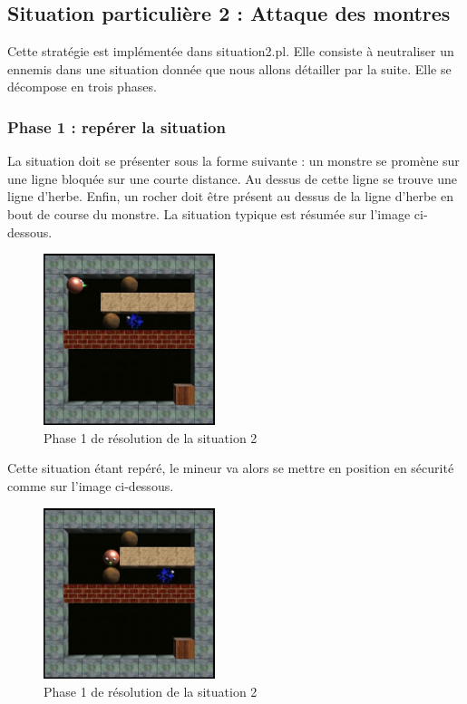 \documentclass[a4paper,11pt]{article}
\begin{document}
	\newpage
	\subsection{Situation particuli\`ere 2 : Attaque des montres}
	
	Cette strat\'egie est impl\'ement\'ee dans situation2.pl. Elle consiste \`a neutraliser un ennemis dans une situation donn\'ee que nous allons d\'etailler par la suite. Elle se d\'ecompose en trois phases.

	\subsubsection{Phase 1 : rep\'erer la situation}
	
La situation doit se pr\'esenter sous la forme suivante : un monstre se prom\`ene sur une ligne bloqu\'ee sur une courte distance. Au dessus de cette ligne se trouve une ligne d'herbe. Enfin, un rocher doit \^etre pr\'esent au dessus de la ligne d'herbe en bout de course du monstre. La situation typique est r\'esum\'ee sur l'image ci-dessous.  
	
		\begin{figure}[h]
			\center
			\includegraphics[width=5cm]{situation2-1}
			\caption{\label{situation21} Phase 1 de r\'esolution de la situation 2 }
		\end{figure}
	
Cette situation \'etant rep\'er\'e, le mineur va alors se mettre en position en s\'ecurit\'e comme sur l'image ci-dessous.
	 
		\begin{figure}[h]
			\center
			\includegraphics[width=5cm]{situation2-2}
			\caption{\label{situation22} Phase 1 de r\'esolution de la situation 2 }
		\end{figure}
	 
\end{document}
